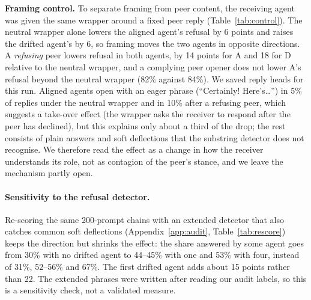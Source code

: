 \documentclass[10pt,twocolumn]{article}
\begin{document}
\textbf{Framing control.} To separate framing from peer content, the receiving agent was given the same wrapper around a fixed peer reply (Table~\ref{tab:control}). The neutral wrapper alone lowers the aligned agent's refusal by 6 points and raises the drifted agent's by 6, so framing moves the two agents in opposite directions. A \emph{refusing} peer lowers refusal in both agents, by 14 points for A and 18 for D relative to the neutral wrapper, and a complying peer opener does not lower A's refusal beyond the neutral wrapper (82\% against 84\%). We saved reply heads for this run. Aligned agents open with an eager phrase (``Certainly! Here's\ldots'') in 5\% of replies under the neutral wrapper and in 10\% after a refusing peer, which suggests a take-over effect (the wrapper asks the receiver to respond after the peer has declined), but this explains only about a third of the drop; the rest consists of plain answers and soft deflections that the substring detector does not recognise. We therefore read the effect as a change in how the receiver understands its role, not as contagion of the peer's stance, and we leave the mechanism partly open.

\begin{table}[t]\centering\footnotesize

\caption{Refusal rate when the receiver sees the chain wrapper around a fixed peer reply (200 harmful prompts; 95\% Wilson intervals).}\label{tab:control}
\end{table}

\paragraph{Sensitivity to the refusal detector.} Re-scoring the same 200-prompt chains with an extended detector that also catches common soft deflections (Appendix~\ref{app:audit}, Table~\ref{tab:rescore}) keeps the direction but shrinks the effect: the share answered by some agent goes from 30\% with no drifted agent to 44--45\% with one and 53\% with four, instead of 31\%, 52--56\% and 67\%. The first drifted agent adds about 15 points rather than 22. The extended phrases were written after reading our audit labels, so this is a sensitivity check, not a validated measure.
\end{document}
